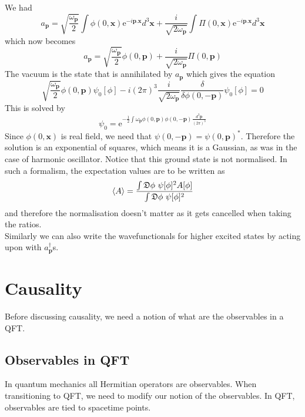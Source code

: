 \documentclass[11pt]{article}
\newcommand{\e}{\mathrm{e}}
\newcommand{\w}{\omega}
\newcommand{\D}{\mathfrak{D}}
\numberwithin{equation}{section}
\begin{document}
    We had 
    \begin{equation}
        a_\textbf{p} = \sqrt{\frac{\w_\textbf{p}}{2}}\int\phi(0, \textbf{x}) \e^{-i \textbf{p}. \textbf{x}}d^3\textbf{x} + \frac{i}{\sqrt{2\w_\textbf{p}}}\int \Pi(0, \textbf{x})\e^{-i \textbf{p}.\textbf{x}} d^3\textbf{x} 
    \end{equation}
    which now becomes 
    \begin{equation}
        a_\textbf{p} = \sqrt{\frac{\w_\textbf{p}}{2}}\phi(0, \textbf{p}) + \frac{i}{\sqrt{2\w_\textbf{p}}}\Pi(0,\textbf{p})
    \end{equation}
    The vacuum is the state that is annihilated by \(a_\textbf{p}\) which gives the equation
    \begin{equation}
        \sqrt{\frac{\w_\textbf{p}}{2}}\phi(0, \textbf{p}) \psi_0[\phi] -i(2\pi)^3 \frac{i}{\sqrt{2\w_\textbf{p}}}\frac{\delta}{\delta \phi(0, -\textbf{p})}\psi_0[\phi] = 0
    \end{equation}
    This is solved by 
    \begin{equation}
        \psi_0 = \displaystyle\e^{-\frac{1}{2}\int \w_\textbf{p} \phi(0, \textbf{p})\phi(0, -\textbf{p})\frac{d^3\textbf{p}}{(2\pi)^3}}
    \end{equation}
    Since \(\phi(0, \textbf{x})\) is real field, we need that \(\psi(0, -\textbf{p}) = \psi(0, \textbf{p})^*\). Therefore the solution is an exponential of squares, which means it is a Gaussian, as was in the case of harmonic oscillator. Notice that this ground state is not normalised. In such a formalism, the expectation values are to be written as 
    \begin{equation}
        \braket{A} = \displaystyle \frac{\int \D \phi ~ \psi[\phi]^2 A[\phi] }{\int \D \phi ~ \psi[\phi]^2}
    \end{equation}
    and therefore the normalisation doesn't matter as it gets cancelled when taking the ratios.\\

    Similarly we can also write the wavefunctionals for higher excited states by acting upon with \(a^\dagger_\textbf{p}\)s.

    \newpage
    \section{Causality}
    Before discussing causality, we need a notion of what are the observables in a QFT. 

    \subsection{Observables in QFT}
    In quantum mechanics all Hermitian operators are observables. When transitioning to QFT, we need to modify our notion of the observables. In QFT, observables are tied to spacetime points.\\
\end{document}
